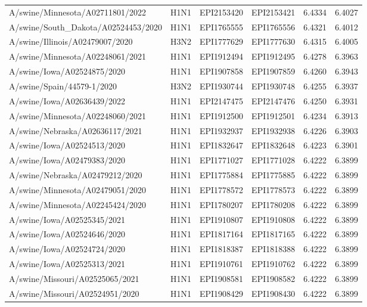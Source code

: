 \begin{tabular}{L{1.95in}|L{.25in}|L{.60in}|L{.6in}|C{1in}|C{1in}}
A/swine/Minnesota/A02711801/2022&H1N1&EPI2153420&EPI2153421&6.4334&6.4027\\
A/swine/South\_Dakota/A02524453/2020&H1N1&EPI1765555&EPI1765556&6.4321&6.4012\\
A/swine/Illinois/A02479007/2020&H3N2&EPI1777629&EPI1777630&6.4315&6.4005\\
A/swine/Minnesota/A02248061/2021&H1N1&EPI1912494&EPI1912495&6.4278&6.3963\\
A/swine/Iowa/A02524875/2020&H1N1&EPI1907858&EPI1907859&6.4260&6.3943\\
A/swine/Spain/44579-1/2020&H3N2&EPI1930744&EPI1930748&6.4255&6.3937\\
A/swine/Iowa/A02636439/2022&H1N1&EPI2147475&EPI2147476&6.4250&6.3931\\
A/swine/Minnesota/A02248060/2021&H1N1&EPI1912500&EPI1912501&6.4234&6.3913\\
A/swine/Nebraska/A02636117/2021&H1N1&EPI1932937&EPI1932938&6.4226&6.3903\\
A/swine/Iowa/A02524513/2020&H1N1&EPI1832647&EPI1832648&6.4223&6.3901\\
A/swine/Iowa/A02479383/2020&H1N1&EPI1771027&EPI1771028&6.4222&6.3899\\
A/swine/Nebraska/A02479212/2020&H1N1&EPI1775884&EPI1775885&6.4222&6.3899\\
A/swine/Minnesota/A02479051/2020&H1N1&EPI1778572&EPI1778573&6.4222&6.3899\\
A/swine/Minnesota/A02245424/2020&H1N1&EPI1780207&EPI1780208&6.4222&6.3899\\
A/swine/Iowa/A02525345/2021&H1N1&EPI1910807&EPI1910808&6.4222&6.3899\\
A/swine/Iowa/A02524646/2020&H1N1&EPI1817164&EPI1817165&6.4222&6.3899\\
A/swine/Iowa/A02524724/2020&H1N1&EPI1818387&EPI1818388&6.4222&6.3899\\
A/swine/Iowa/A02525313/2021&H1N1&EPI1910761&EPI1910762&6.4222&6.3899\\
A/swine/Missouri/A02525065/2021&H1N1&EPI1908581&EPI1908582&6.4222&6.3899\\
A/swine/Missouri/A02524951/2020&H1N1&EPI1908429&EPI1908430&6.4222&6.3899\\

\end{tabular}
